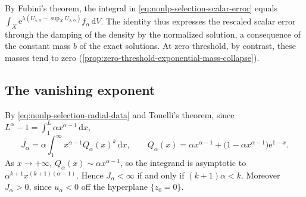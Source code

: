 By Fubini's theorem, the integral in \eqref{eq:nonlp-selection-scalar-error} equals $\int_X\mathrm{e}^{\lambda(U_{\lambda,\alpha}-\sup_XU_{\lambda,\alpha})}f_\alpha\,\mathrm{d}V$. The identity thus expresses the rescaled scalar error through the damping of the density by the normalized solution, a consequence of the constant mass $b$ of the exact solutions. At zero threshold, by contrast, these masses tend to zero (\cref{prop:zero-threshold-exponential-mass-collapse}).

\subsection{The vanishing exponent}

By \eqref{eq:nonlp-selection-radial-data} and Tonelli's theorem, since $L^\alpha-1=\int_1^L\alpha x^{\alpha-1}\,\mathrm{d}x$,
\begin{equation}\label{eq:nonlp-selection-moment-formula}
 J_\alpha=\alpha\int_1^\infty x^{\alpha-1}Q_\alpha(x)^k\,\mathrm{d}x,\qquad
 Q_\alpha(x)=\alpha x^{\alpha-1}+\bigl(1-\alpha x^{\alpha-1}\bigr)\mathrm{e}^{1-x}.
\end{equation}
As $x\to+\infty$, $Q_\alpha(x)\sim\alpha x^{\alpha-1}$, so the integrand is asymptotic to $\alpha^{k+1}x^{(k+1)(\alpha-1)}$. Hence $J_\alpha<\infty$ if and only if $(k+1)\alpha<k$. Moreover $J_\alpha>0$, since $u_\alpha<0$ off the hyperplane $\{z_0=0\}$.

